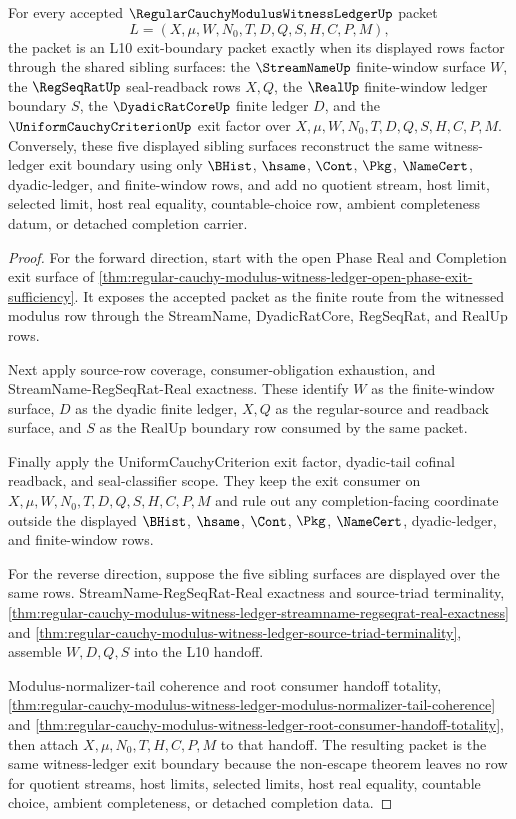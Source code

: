 \begin{theorem}
\label{thm:regular-cauchy-modulus-witness-ledger-exit-boundary}
For every accepted $\RegularCauchyModulusWitnessLedgerUp$ packet
$$
L=(X,\mu,W,N_0,T,D,Q,S,H,C,P,M),
$$
the packet is an L10 exit-boundary packet exactly when its displayed rows factor through the shared sibling surfaces: the $\StreamNameUp$ finite-window surface $W$, the $\RegSeqRatUp$ seal-readback rows $X,Q$, the $\RealUp$ finite-window ledger boundary $S$, the $\DyadicRatCoreUp$ finite ledger $D$, and the $\UniformCauchyCriterionUp$ exit factor over $X,\mu,W,N_0,T,D,Q,S,H,C,P,M$. Conversely, these five displayed sibling surfaces reconstruct the same witness-ledger exit boundary using only $\BHist$, $\hsame$, $\Cont$, $\Pkg$, $\NameCert$, dyadic-ledger, and finite-window rows, and add no quotient stream, host limit, selected limit, host real equality, countable-choice row, ambient completeness datum, or detached completion carrier.
\end{theorem}
\begin{proof}
For the forward direction, start with the open Phase Real and Completion exit surface of \autoref{thm:regular-cauchy-modulus-witness-ledger-open-phase-exit-sufficiency}. It exposes the accepted packet as the finite route from the witnessed modulus row through the StreamName, DyadicRatCore, RegSeqRat, and RealUp rows.

Next apply source-row coverage, consumer-obligation exhaustion, and StreamName-RegSeqRat-Real exactness. These identify $W$ as the finite-window surface, $D$ as the dyadic finite ledger, $X,Q$ as the regular-source and readback surface, and $S$ as the RealUp boundary row consumed by the same packet.

Finally apply the UniformCauchyCriterion exit factor, dyadic-tail cofinal readback, and seal-classifier scope. They keep the exit consumer on $X,\mu,W,N_0,T,D,Q,S,H,C,P,M$ and rule out any completion-facing coordinate outside the displayed $\BHist$, $\hsame$, $\Cont$, $\Pkg$, $\NameCert$, dyadic-ledger, and finite-window rows.

For the reverse direction, suppose the five sibling surfaces are displayed over the same rows. StreamName-RegSeqRat-Real exactness and source-triad terminality, \autoref{thm:regular-cauchy-modulus-witness-ledger-streamname-regseqrat-real-exactness} and \autoref{thm:regular-cauchy-modulus-witness-ledger-source-triad-terminality}, assemble $W,D,Q,S$ into the L10 handoff.

Modulus-normalizer-tail coherence and root consumer handoff totality, \autoref{thm:regular-cauchy-modulus-witness-ledger-modulus-normalizer-tail-coherence} and \autoref{thm:regular-cauchy-modulus-witness-ledger-root-consumer-handoff-totality}, then attach $X,\mu,N_0,T,H,C,P,M$ to that handoff. The resulting packet is the same witness-ledger exit boundary because the non-escape theorem leaves no row for quotient streams, host limits, selected limits, host real equality, countable choice, ambient completeness, or detached completion data.
\end{proof}

